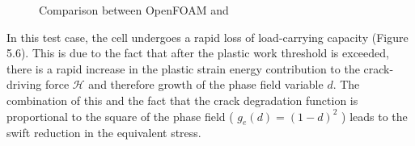 \documentclass[sn-mathphys,Numbered,draft]{sn-jnl}%
\begin{document}
\begin{appendices}
\begin{figure}[htbp]
	\centering
		
		
		\caption{Comparison between OpenFOAM and \cite{borden_phase-field_2016}}
	\label{label_for_entire_figure}
\end{figure}

In this test case, the cell undergoes a rapid loss of load-carrying capacity (Figure 5.6). This is due to the fact that after the plastic work threshold is exceeded, there is a rapid increase in the plastic strain energy contribution to the crack-driving force $\mathcal{H}$ and therefore growth of the phase field variable $d$. The combination of this and the fact that the crack degradation function is proportional to the square of the phase field ( $g_e(d)=(1-d)^2$ ) leads to the swift reduction in the equivalent stress. 


\end{appendices}
\end{document}
